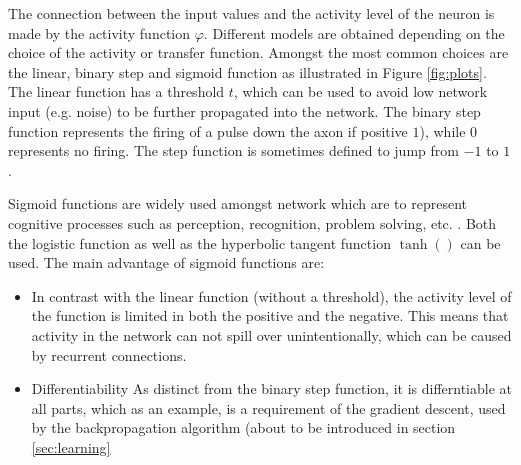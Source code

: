 \documentclass[10pt,a4paper,DIV=11]{scrreprt}
\begin{document}
The connection between the input values and the activity level of the neuron is made by the activity function $\varphi$. Different models are obtained depending on the choice of the activity or transfer function. Amongst the most common choices are the linear, binary step and sigmoid function as illustrated in Figure \ref{fig:plots}. The linear function has a threshold $t$, which can be used to avoid low network input (e.g. noise) to be further propagated into the network. The binary step function represents the firing of a pulse down the axon if positive $1$), while $0$ represents no firing. The step function is sometimes defined to jump from $-1$ to $1$. 

Sigmoid functions are widely used amongst network which are to represent cognitive processes such as perception, recognition, problem solving, etc. .
Both the logistic function as well as the hyperbolic tangent function $\tanh()$ can be used. The main advantage of sigmoid functions are:

\begin{itemize}
\item In contrast with the linear function (without a threshold), the activity level of the function is limited in both the positive and the negative. This means that activity in the network can not spill over unintentionally, which can be caused by recurrent connections.
\item Differentiability
As distinct from the binary step function, it is differntiable at all parts, which as an example, is a requirement of the gradient descent, used by the backpropagation algorithm (about to be introduced in section \ref{sec:learning}
\end{itemize}
\end{document}
